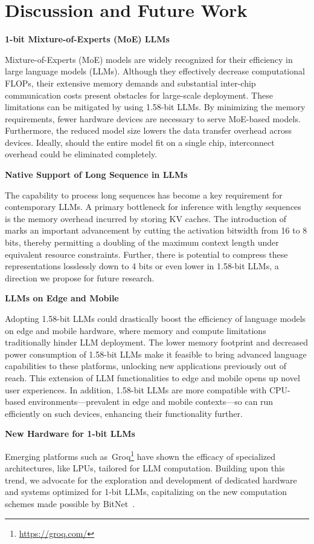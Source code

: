 \section{Discussion and Future Work}

\textbf{1-bit Mixture-of-Experts (MoE) LLMs}

Mixture-of-Experts (MoE) models are widely recognized for their efficiency in large language models (LLMs). Although they effectively decrease computational FLOPs, their extensive memory demands and substantial inter-chip communication costs present obstacles for large-scale deployment. These limitations can be mitigated by using 1.58-bit LLMs. By minimizing the memory requirements, fewer hardware devices are necessary to serve MoE-based models. Furthermore, the reduced model size lowers the data transfer overhead across devices. Ideally, should the entire model fit on a single chip, interconnect overhead could be eliminated completely.

\textbf{Native Support of Long Sequence in LLMs}

The capability to process long sequences has become a key requirement for contemporary LLMs. A primary bottleneck for inference with lengthy sequences is the memory overhead incurred by storing KV caches. The introduction of  marks an important advancement by cutting the activation bitwidth from 16 to 8 bits, thereby permitting a doubling of the maximum context length under equivalent resource constraints. Further, there is potential to compress these representations losslessly down to 4 bits or even lower in 1.58-bit LLMs, a direction we propose for future research.

\textbf{LLMs on Edge and Mobile}

Adopting 1.58-bit LLMs could drastically boost the efficiency of language models on edge and mobile hardware, where memory and compute limitations traditionally hinder LLM deployment. The lower memory footprint and decreased power consumption of 1.58-bit LLMs make it feasible to bring advanced language capabilities to these platforms, unlocking new applications previously out of reach. This extension of LLM functionalities to edge and mobile opens up novel user experiences. In addition, 1.58-bit LLMs are more compatible with CPU-based environments—prevalent in edge and mobile contexts—so  can run efficiently on such devices, enhancing their functionality further.

\textbf{New Hardware for 1-bit LLMs}

Emerging platforms such as~Groq\footnote{\url{https://groq.com/}} have shown the efficacy of specialized architectures, like LPUs, tailored for LLM computation. Building upon this trend, we advocate for the exploration and development of dedicated hardware and systems optimized for 1-bit LLMs, capitalizing on the new computation schemes made possible by BitNet~\cite{bitnet}.